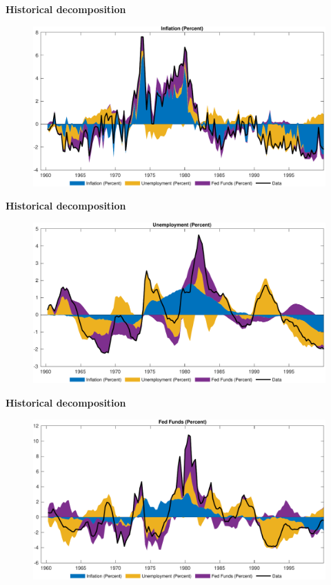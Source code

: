 \documentclass[10pt,english,t,aspectratio=169,ignorenonframetext]{beamer}
\begin{document}

\begin{frame}
{\textbf{Historical decomposition}}\medskip

\begin{figure}[h]
\includegraphics[width=.75\textwidth]{SW_HD_1.pdf}
\end{figure}
\end{frame}


\begin{frame}
{\textbf{Historical decomposition}}\medskip

\begin{figure}[h]
\includegraphics[width=.75\textwidth]{SW_HD_2.pdf}
\end{figure}
\end{frame}


\begin{frame}
{\textbf{Historical decomposition}}\medskip

\begin{figure}[h]
\includegraphics[width=.75\textwidth]{SW_HD_3.pdf}
\end{figure}
\end{frame}
\end{document}
